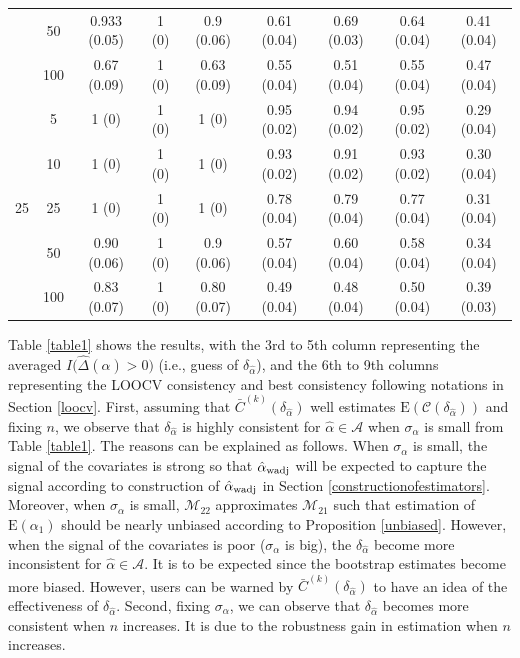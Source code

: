 \documentclass[11pt]{article}
\def\mc#1{\mathcal{#1}} %
\def\E#1{\mathrm{E}(#1)} %
\theoremstyle{definition}
\begin{document}
\begin{table}[t]
\begin{center}
\begin{tabular}{cc|ccc|cccc}
  & 50  & 0.933 (0.05) & 1 (0) & 0.9 (0.06) & 0.61 (0.04) & 0.69 (0.03) & 0.64 (0.04) & 0.41 (0.04) \\ 
  & 100  & 0.67 (0.09) & 1 (0) & 0.63 (0.09) & 0.55 (0.04) & 0.51 (0.04) & 0.55 (0.04) & 0.47 (0.04) \\[.3cm]  
  \multirow{5}{*}{25} & 5  & 1 (0) & 1 (0) & 1 (0) & 0.95 (0.02) & 0.94 (0.02) & 0.95 (0.02) & 0.29 (0.04) \\ 
  & 10  & 1 (0) & 1 (0) & 1 (0) & 0.93 (0.02) & 0.91 (0.02) & 0.93 (0.02) & 0.30 (0.04) \\ 
  & 25  & 1 (0) & 1 (0) & 1 (0) & 0.78 (0.04) & 0.79 (0.04) & 0.77 (0.04) & 0.31 (0.04) \\ 
  & 50  & 0.90 (0.06) & 1 (0) & 0.9 (0.06) & 0.57 (0.04) & 0.60 (0.04) & 0.58 (0.04) & 0.34 (0.04) \\ 
    & 100  & 0.83 (0.07) & 1 (0) & 0.80 (0.07) & 0.49 (0.04) & 0.48 (0.04) & 0.50 (0.04) & 0.39 (0.03) \\ 
\end{tabular}  
\end{center}
 \vspace{-.5cm}
\end{table}

 Table \ref{table1} shows the results, with the 3rd to 5th column representing the averaged $I\big(\hat{\Delta}(\hat{\alpha})>0\big)$ (i.e., guess of $\delta_{\hat{\alpha}}$), and the 6th to 9th columns representing the LOOCV consistency and best consistency following notations in Section \ref{loocv}. First, assuming that $\bar{C}^{(k)}(\delta_{\hat{\alpha}})$ well estimates $\E{\mc{C}(\delta_{\hat{\alpha}}})$ and fixing $n$, we  observe that $\delta_{\hat{\alpha}}$ is highly consistent for $\hat{\alpha}\in \mc{A}$ when $\sigma_{\alpha}$ is small  from Table \ref{table1}. The reasons can be explained as follows. When $\sigma_{\alpha}$ is small, the signal of the covariates is strong so that $\hat{\alpha}_{\rm wadj}$ will be expected to capture the signal according to construction of $\hat{\alpha}_{\rm wadj}$ in Section \ref{constructionofestimators}. Moreover, when $\sigma_{\alpha}$ is small, $\mc{M}_{22}$ approximates $\mc{M}_{21}$ such that estimation of $\E{\alpha_1}$ should be nearly unbiased according to Proposition \ref{unbiased}. However, when the signal of the covariates is poor ($\sigma_{\alpha}$ is big), the $\delta_{\hat{\alpha}}$  become more inconsistent for $\hat{\alpha}\in \mc{A}$. It is to be expected since the bootstrap estimates become more biased. However, users can be warned by $\bar{C}^{(k)}(\delta_{\hat{\alpha}})$ to have an idea of the effectiveness of $\delta_{\hat{\alpha}}$. Second, fixing $\sigma_{\alpha}$, we can observe that $\delta_{\hat{\alpha}}$ becomes more consistent when $n$ increases. It is due to the robustness gain in estimation when $n$ increases.  
\end{document}
